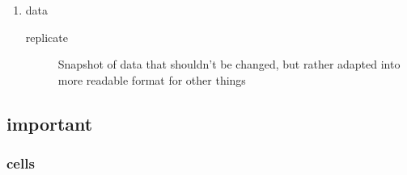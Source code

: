 \documentclass[11pt]{article}
\begin{document}
\begin{enumerate}
\item data
\label{sec:org6a188a1}

\begin{description}
\item[{replicate}] Snapshot of data that shouldn't be changed, but rather
adapted into more readable format for other things
\end{description}
\end{enumerate}
\subsection{important}
\label{sec:orgfcd8c1c}
\subsubsection{cells}
\label{sec:org516f931}
\end{document}
